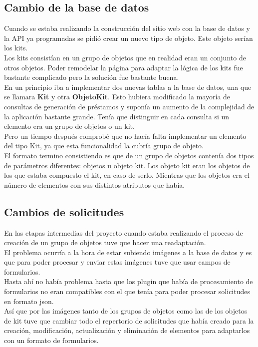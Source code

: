 \subsection{Cambio de la base de datos}
Cuando se estaba realizando la construcción del sitio web con la base de datos y la API ya programadas se pidió crear un nuevo tipo de objeto. Este objeto serían los kits.
\\Los kits consistían en un grupo de objetos que en realidad eran un conjunto de otros objetos. Poder remodelar la página para adaptar la lógica de los kits fue bastante complicado pero la solución fue bastante buena.
\\En un principio iba a implementar dos nuevas tablas a la base de datos, una que se llamara \textbf{Kit} y otra \textbf{ObjetoKit}. Esto hubiera modificado la mayoría de consultas de generación de préstamos y suponía un aumento de la complejidad de la aplicación bastante grande. Tenía que distinguir en cada consulta si un elemento era un grupo de objetos o un kit.
\\Pero un tiempo después comprobé que no hacía falta implementar un elemento del tipo Kit, ya que esta funcionalidad la cubría grupo de objeto.
\\El formato termino consistiendo es que de un grupo de objetos contenía dos tipos de parámetros diferentes: objetos u objeto kit. Los objeto kit eran los objetos de los que estaba compuesto el kit, en caso de serlo. Mientras que los objetos era el número de elementos con sus distintos atributos que había.

\subsection{Cambios de solicitudes}
En las etapas intermedias del proyecto cuando estaba realizando el proceso de creación de un grupo de objetos tuve que hacer una readaptación.
\\El problema ocurría a la hora de estar subiendo imágenes a la base de datos y es que para poder procesar y enviar estas imágenes tuve que usar campos de formularios.
\\Hasta ahí no había problema hasta que los plugin que había de procesamiento de formularios no eran compatibles con el que tenía para poder procesar solicitudes en formato json.
\\Así que por las imágenes tanto de los grupos de objetos como las de los objetos de kit tuve que cambiar todo el repertorio de solicitudes que había creado para la creación, modificación, actualización y eliminación de elementos para adaptarlos con un formato de formularios.

